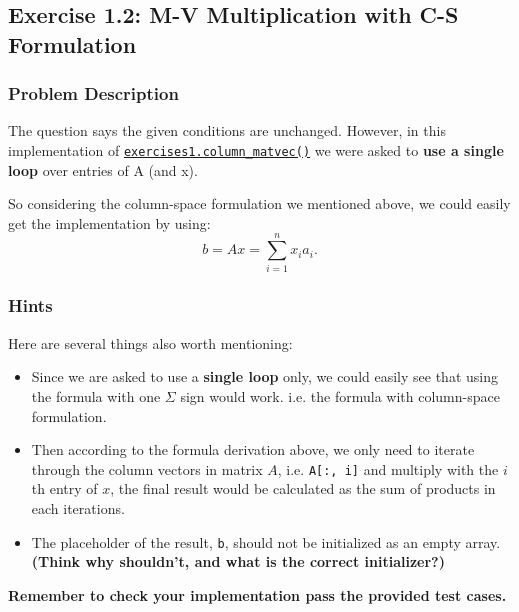 \subsection*{Exercise 1.2: M-V Multiplication with C-S Formulation}%
\subsubsection*{Problem Description}
The question says the given conditions are unchanged. However, in this implementation of \href{https://comp-lin-alg.github.io/cla_utils.html#cla_utils.exercises1.column_matvec}{\texttt{exercises1.column\_matvec()}} we were asked to \textbf{use a single loop} over entries of A (and x).

\medskip
\noindent So considering the column-space formulation we mentioned above, we could easily get the implementation by using:
\[
b = Ax =  \sum_{i=1}^{n} x_i a_i
.\]

% 
\subsubsection*{Hints} 
Here are several things also worth mentioning:
\begin{itemize}
\item Since we are asked to use a \textbf{single loop} only, we could easily see that using the formula with one $\Sigma$ sign would work. i.e. the formula with column-space formulation.
\item Then according to the formula derivation above, we only need to iterate through the column vectors in matrix $A$, i.e. \texttt{A[:, i]} and multiply with the $i$th entry of $x$, the final result would be calculated as the sum of products in each iterations.
\item The placeholder of the result, \texttt{b}, should not be initialized as an empty array. \textbf{(Think why shouldn't, and what is the correct initializer?)}
\end{itemize}
\textbf{Remember to check your implementation pass the provided test cases.}

